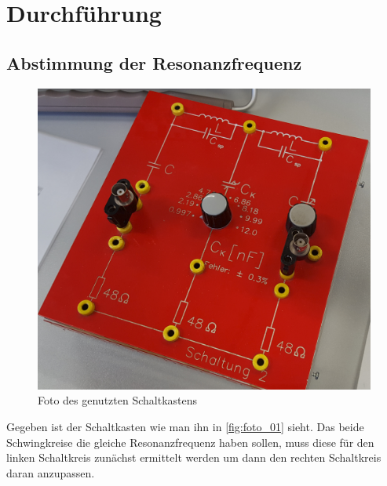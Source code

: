 \section{Durchführung}
\label{sec:Durchführung}


\subsection{Abstimmung der Resonanzfrequenz}

\begin{figure}
    \centering
    \includegraphics[width=\textwidth/2]{images/foto_01.png}
    \caption{Foto des genutzten Schaltkastens}
    \label{fig:foto_01}
\end{figure}
Gegeben ist der Schaltkasten wie man ihn in \autoref{fig:foto_01} sieht.
Das beide Schwingkreise die gleiche Resonanzfrequenz haben sollen, muss diese für den linken Schaltkreis zunächst ermittelt werden um dann den rechten Schaltkreis daran anzupassen.

